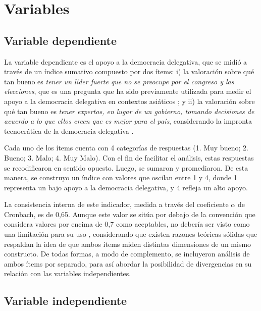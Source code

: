 \documentclass[12pt,twoside]{templates/facsothesis}
\begin{document}
\FloatBarrier

\hypertarget{variables}{%
\section{Variables}\label{variables}}

\hypertarget{variable-dependiente}{%
\subsection*{Variable dependiente}\label{variable-dependiente}}

La variable dependiente es el apoyo a la democracia delegativa, que se midió a través de un índice sumativo compuesto por dos ítems: i) la valoración sobre qué tan bueno es \emph{tener un líder fuerte que no se preocupe por el congreso y las elecciones}, que es una pregunta que ha sido previamente utilizada para medir el apoyo a la democracia delegativa en contextos asiáticos \citep{kang2018}; y ii) la valoración sobre qué tan bueno es \emph{tener expertos, en lugar de un gobierno, tomando decisiones de acuerdo a lo que ellos creen que es mejor para el país}, considerando la impronta tecnocrática de la democracia delegativa \citep{odonnell1994}.

Cada uno de los ítems cuenta con 4 categorías de respuestas (1. Muy bueno; 2. Bueno; 3. Malo; 4. Muy Malo). Con el fin de facilitar el análisis, estas respuestas se recodificaron en sentido opuesto. Luego, se sumaron y promediaron. De esta manera, se construyo un índice con valores que oscilan entre 1 y 4, donde 1 representa un bajo apoyo a la democracia delegativa, y 4 refleja un alto apoyo.

La consistencia interna de este indicador, medida a través del coeficiente \(\alpha\) de Cronbach, es de 0,65. Aunque este valor se sitúa por debajo de la convención que considera valores por encima de 0,7 como aceptables, no debería ser visto como una limitación para su uso \citep{schmitt1996}, considerando que existen razones teóricas sólidas que respaldan la idea de que ambos ítems miden distintas dimensiones de un mismo constructo. De todas formas, a modo de complemento, se incluyeron análisis de ambos ítems por separado, para así abordar la posibilidad de divergencias en su relación con las variables independientes.

\hypertarget{variable-independiente}{%
\subsection*{Variable independiente}\label{variable-independiente}}
\end{document}
